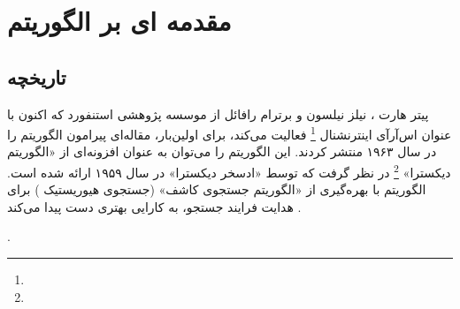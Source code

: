 \chapter{مقدمه ای بر الگوریتم }
\section{تاریخچه}
پیتر هارت 
، نیلز نیلسون 
و برترام رافائل 
از موسسه پژوهشی استنفورد 
که اکنون با عنوان اس‌آرآی اینترنشنال 
\footnote{} 
فعالیت می‌کند، برای اولین‌بار، مقاله‌ای پیرامون الگوریتم
 را در سال ۱۹۶۳ منتشر کردند. این الگوریتم را می‌توان به عنوان افزونه‌ای از «الگوریتم دیکسترا» 
\footnote{}
  در نظر گرفت که توسط «ادسخر دیکسترا»
   در سال ۱۹۵۹ ارائه شده است. الگوریتم 
   با بهره‌گیری از «الگوریتم جستجوی کاشف» (جستجوی هیوریستیک  
   ) 
   برای هدایت فرایند جستجو، به کارایی بهتری دست پیدا می‌کند
\cite{ELhamalgoritma_star}
.

.